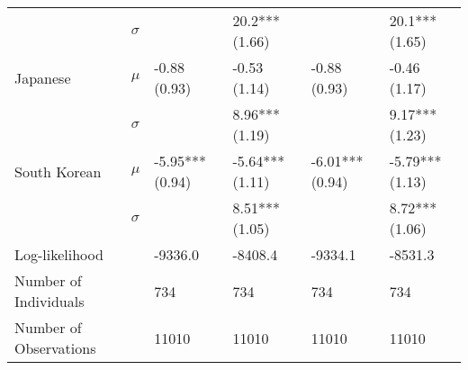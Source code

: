\begin{tabular}{llllll}
                          &  $\sigma$ &                               &                20.2*** (1.66) &                                &                 20.1*** (1.65) \\
                 Japanese &     $\mu$ &                  -0.88 (0.93) &                  -0.53 (1.14) &                   -0.88 (0.93) &                   -0.46 (1.17) \\
                          &  $\sigma$ &                               &                8.96*** (1.19) &                                &                 9.17*** (1.23) \\
             South Korean &     $\mu$ &               -5.95*** (0.94) &               -5.64*** (1.11) &                -6.01*** (0.94) &                -5.79*** (1.13) \\
                          &  $\sigma$ &                               &                8.51*** (1.05) &                                &                 8.72*** (1.06) \\
    \hline Log-likelihood &           &                       -9336.0 &                       -8408.4 &                        -9334.1 &                        -8531.3 \\
    Number of Individuals &           &                           734 &                           734 &                            734 &                            734 \\
   Number of Observations &           &                         11010 &                         11010 &                          11010 &                          11010 \\
\bottomrule
\end{tabular}
